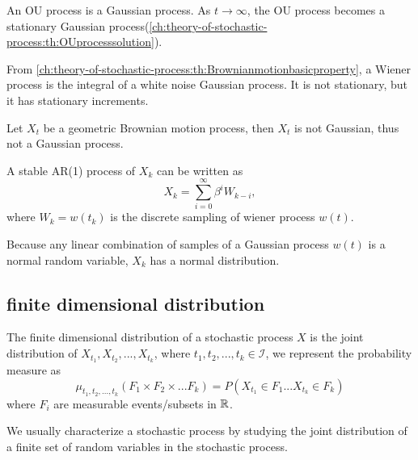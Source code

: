 \begin{refsection}
\begin{example}
An OU process is a Gaussian process.
As $t\to \infty$, the OU process becomes a stationary Gaussian process(\autoref{ch:theory-of-stochastic-process:th:OUprocesssolution}).
\end{example}



\begin{example}
From \autoref{ch:theory-of-stochastic-process:th:Brownianmotionbasicproperty}, a Wiener process is the integral of a white noise Gaussian process. It is not stationary, but it has stationary increments.
\end{example}

\begin{example}
Let $X_t$ be a geometric Brownian motion process, then $X_t$ is not Gaussian, thus not a Gaussian process.
\end{example}

\begin{example}
A stable AR(1) process of $X_k$ can be written as
$$X_k = \sum_{i=0}^\infty \beta^i W_{k-i},$$
where $W_k = w(t_k)$ is the discrete sampling of wiener process $w(t)$.

Because any linear combination of samples of a Gaussian process $w(t)$ is a normal random variable, $X_k$	has a normal distribution.
\end{example}





\subsection{finite dimensional distribution}

\begin{definition}
The finite dimensional distribution of a stochastic process $X$ is the joint distribution of $X_{t_1},X_{t_2},...,X_{t_k}$, where $t_1,t_2,...,t_k \in \mathcal{I}$, we represent the probability measure as
$$\mu_{t_1,t_2,...,t_k}(F_1\times F_2 \times ... F_k) = P(X_{t_1}\in F_1 ... X_{t_k}\in F_k)$$
where $F_i$ are measurable events/subsets in $\mathbb{R}$.
\end{definition}


\begin{remark}[purpose]
We usually characterize a stochastic process by studying the joint distribution of a finite set of random variables in the stochastic process. 	
\end{remark}



\end{refsection}
